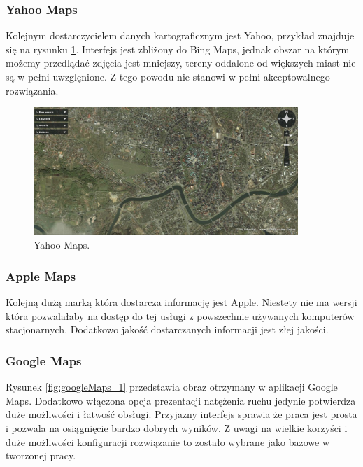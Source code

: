 \subsubsection{Yahoo Maps}
\label{subsubsec:Yahoo Maps}

Kolejnym dostarczycielem danych kartograficznym jest Yahoo, przykład znajduje się na rysunku \ref{fig:yahooMaps_1}. Interfejs jest zbliżony do Bing Maps, jednak obszar na którym możemy przedlądać zdjęcia jest mniejszy, tereny oddalone od większych miast nie są w pełni uwzglęnione. Z tego powodu nie stanowi w pełni akceptowalnego rozwiązania.

\begin{figure}[H]
  \centering
    \includegraphics[width=100mm]{ge/yahoo_1.jpg}
  \caption{Yahoo Maps.}
  \label{fig:yahooMaps_1}
\end{figure}


\subsubsection{Apple Maps}
\label{subsubsec:Apple Maps}

Kolejną dużą marką która dostarcza informację jest Apple. Niestety nie ma wersji która pozwalałaby na dostęp do tej usługi z powszechnie używanych komputerów stacjonarnych. Dodatkowo jakość dostarczanych informacji jest złej jakości.

\subsubsection{Google Maps}
\label{subsubsec:Google Maps}
\nocite{googlemapsbegin}
Rysunek \ref{fig:googleMaps_1} przedstawia obraz otrzymany w aplikacji Google Maps. Dodatkowo włączona opcja prezentacji natężenia ruchu jedynie potwierdza duże możliwości i łatwość obsługi. Przyjazny interfejs sprawia że praca jest prosta i pozwala na osiągnięcie bardzo dobrych wyników. Z uwagi na wielkie korzyści i duże możliwości konfiguracji rozwiązanie to zostało wybrane jako bazowe w tworzonej pracy.


